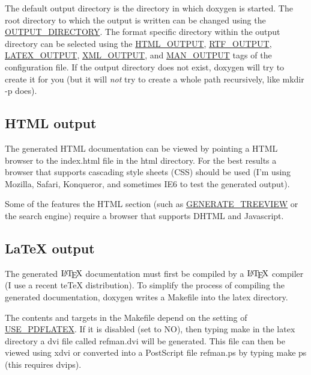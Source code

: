 The default output directory is the directory in which {\ttfamily doxygen} is started. The root directory to which the output is written can be changed using the \hyperlink{config_cfg_output_directory}{OUTPUT\_\-DIRECTORY}. The format specific directory within the output directory can be selected using the \hyperlink{config_cfg_html_output}{HTML\_\-OUTPUT}, \hyperlink{config_cfg_rtf_output}{RTF\_\-OUTPUT}, \hyperlink{config_cfg_latex_output}{LATEX\_\-OUTPUT}, \hyperlink{config_cfg_xml_output}{XML\_\-OUTPUT}, and \hyperlink{config_cfg_man_output}{MAN\_\-OUTPUT} tags of the configuration file. If the output directory does not exist, {\ttfamily doxygen} will try to create it for you (but it will {\itshape not\/} try to create a whole path recursively, like {\ttfamily mkdir -\/p} does).\hypertarget{starting_html_out}{}\subsection{HTML output}\label{starting_html_out}
 The generated HTML documentation can be viewed by pointing a HTML browser to the {\ttfamily index.html} file in the {\ttfamily html} directory. For the best results a browser that supports cascading style sheets (CSS) should be used (I'm using Mozilla, Safari, Konqueror, and sometimes IE6 to test the generated output).

Some of the features the HTML section (such as \hyperlink{config_cfg_generate_treeview}{GENERATE\_\-TREEVIEW} or the search engine) require a browser that supports DHTML and Javascript.\hypertarget{starting_latex_out}{}\subsection{LaTeX output}\label{starting_latex_out}
 The generated $\mbox{\LaTeX}$ documentation must first be compiled by a $\mbox{\LaTeX}$ compiler (I use a recent teTeX distribution). To simplify the process of compiling the generated documentation, {\ttfamily doxygen} writes a {\ttfamily Makefile} into the {\ttfamily latex} directory.

The contents and targets in the {\ttfamily Makefile} depend on the setting of \hyperlink{config_cfg_use_pdflatex}{USE\_\-PDFLATEX}. If it is disabled (set to {\ttfamily NO}), then typing {\ttfamily make} in the {\ttfamily latex} directory a dvi file called {\ttfamily refman.dvi} will be generated. This file can then be viewed using {\ttfamily xdvi} or converted into a PostScript file {\ttfamily refman.ps} by typing {\ttfamily make ps} (this requires {\ttfamily dvips}).

